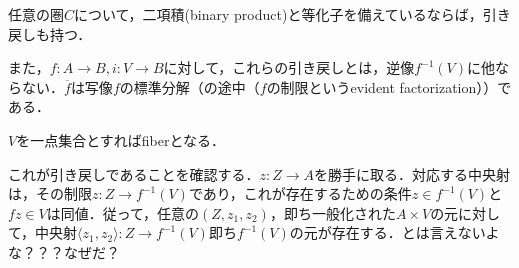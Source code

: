 \documentclass[uplatex, dvipdfmx]{jsarticle}
\begin{document}
\begin{corollary}\label{corollary-nesessaries-for-pullback-categories}
    任意の圏$C$について，二項積(binary product)と等化子を備えているならば，引き戻しも持つ．
\end{corollary}

\begin{example}
    また，$f:A\to B, i:V\to B$に対して，これらの引き戻しとは，逆像$f^{-1}(V)$に他ならない．$\overline{f}$は写像$f$の標準分解（の途中（$f$の制限というevident factorization））である．
    \begin{center}
    \end{center}
    $V$を一点集合とすればfiberとなる．

    これが引き戻しであることを確認する．$z:Z\to A$を勝手に取る．対応する中央射は，その制限$z:Z\to f^{-1}(V)$であり，これが存在するための条件$z\in f^{-1}(V)$と$fz\in V$は同値．従って，任意の$(Z,z_1,z_2)$，即ち一般化された$A\times V$の元に対して，中央射$\langle z_1,z_2\rangle :Z\to f^{-1}(V)$即ち$f^{-1}(V)$の元が存在する．とは言えないよな？？？なぜだ？
\end{example}
\end{document}
